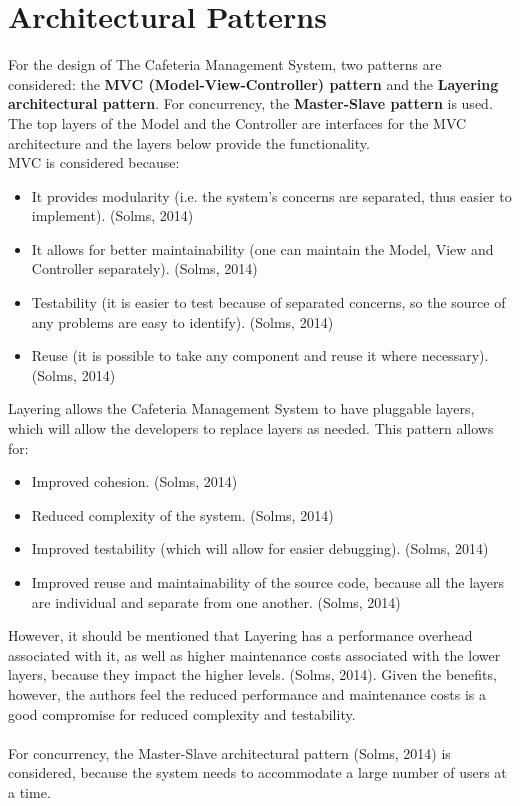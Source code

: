 \documentclass[12pt]{article}
\begin{document}
\section{Architectural Patterns}
		For the design of The Cafeteria Management System, two patterns are considered: the \textbf{MVC (Model-View-Controller) pattern} and the \textbf{Layering architectural pattern}. For concurrency, the \textbf{Master-Slave pattern} is used.\\
		The top layers of the Model and the Controller are interfaces for the MVC architecture and the layers below provide the functionality.\\
		MVC is considered because:
		\begin{itemize}
			\item It provides modularity (i.e. the system's concerns are separated, thus easier to implement). (Solms, 2014)
			\item It allows for better maintainability (one can maintain the Model, View and Controller separately). (Solms, 2014)
			\item Testability (it is easier to test because of separated concerns, so the source of any problems are easy to identify). (Solms, 2014)
			\item Reuse (it is possible to take any component and reuse it where necessary). (Solms, 2014)
		\end{itemize} 
		Layering allows the Cafeteria Management System to have pluggable layers, which will allow the developers to replace layers as needed.
		This pattern allows for: 
		\begin{itemize}
			\item Improved cohesion. (Solms, 2014)
			\item Reduced complexity of the system. (Solms, 2014)
			\item Improved testability (which will allow for easier debugging). (Solms, 2014)
			\item Improved reuse and maintainability of the source code, because all the layers are individual and separate from one another. (Solms, 2014)
		\end{itemize}
		However, it should be mentioned that Layering has a performance overhead associated with it, as well as higher maintenance costs associated with the lower layers, because they impact the higher levels. (Solms, 2014). Given the benefits, however, the authors feel the reduced performance and maintenance costs is a good compromise for reduced complexity and testability.\\
		\\
		For concurrency, the Master-Slave architectural pattern (Solms, 2014) is considered, because the system needs to accommodate a large number of users at a time.
\end{document}
